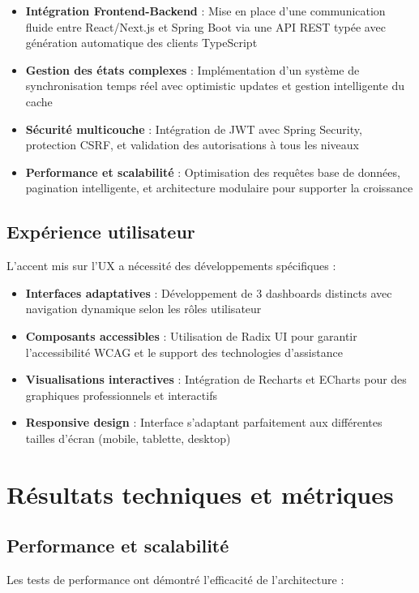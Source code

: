 \documentclass[12pt,a4paper]{report}
\begin{document}
\begin{itemize}
\item \textbf{Intégration Frontend-Backend} : Mise en place d'une communication fluide entre React/Next.js et Spring Boot via une API REST typée avec génération automatique des clients TypeScript
\item \textbf{Gestion des états complexes} : Implémentation d'un système de synchronisation temps réel avec optimistic updates et gestion intelligente du cache
\item \textbf{Sécurité multicouche} : Intégration de JWT avec Spring Security, protection CSRF, et validation des autorisations à tous les niveaux
\item \textbf{Performance et scalabilité} : Optimisation des requêtes base de données, pagination intelligente, et architecture modulaire pour supporter la croissance
\end{itemize}

\subsection{Expérience utilisateur}
L'accent mis sur l'UX a nécessité des développements spécifiques :

\begin{itemize}
\item \textbf{Interfaces adaptatives} : Développement de 3 dashboards distincts avec navigation dynamique selon les rôles utilisateur
\item \textbf{Composants accessibles} : Utilisation de Radix UI pour garantir l'accessibilité WCAG et le support des technologies d'assistance
\item \textbf{Visualisations interactives} : Intégration de Recharts et ECharts pour des graphiques professionnels et interactifs
\item \textbf{Responsive design} : Interface s'adaptant parfaitement aux différentes tailles d'écran (mobile, tablette, desktop)
\end{itemize}


\section{Résultats techniques et métriques}

\subsection{Performance et scalabilité}
Les tests de performance ont démontré l'efficacité de l'architecture :
\end{document}
